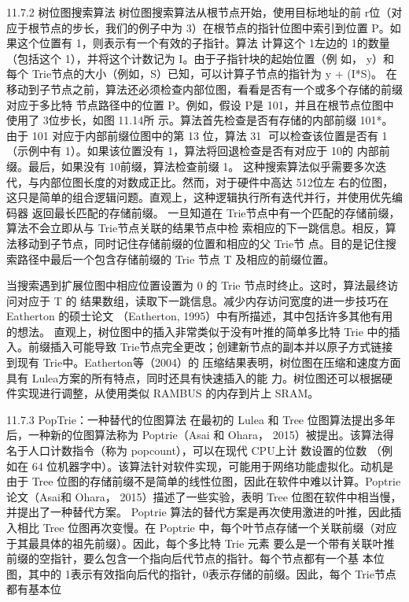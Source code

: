 11.7.2 树位图搜索算法
树位图搜索算法从根节点开始，使用目标地址的前 r位（对应于根节点的步长，我们的例子中为
3）在根节点的指针位图中索引到位置 P。如果这个位置有 1，则表示有一个有效的子指针。算法
计算这个 1左边的 1的数量（包括这个 1），并将这个计数记为 I。由于子指针块的起始位置（例
如， y）和每个 Trie节点的大小（例如，S）已知，可以计算子节点的指针为 y + (I*S)。
在移动到子节点之前，算法还必须检查内部位图，看看是否有一个或多个存储的前缀对应于多比特
节点路径中的位置 P。例如，假设 P是 101，并且在根节点位图中使用了 3位步长，如图 11.14所
示。算法首先检查是否有存储的内部前缀 101*。由于 101 对应于内部前缀位图中的第 13 位，算法
                                                      31
可以检查该位置是否有 1（示例中有 1）。如果该位置没有 1，算法将回退检查是否有对应于 10的
内部前缀。最后，如果没有 10前缀，算法检查前缀 1。
这种搜索算法似乎需要多次迭代，与内部位图长度的对数成正比。然而，对于硬件中高达 512位左
右的位图，这只是简单的组合逻辑问题。直观上，这种逻辑执行所有迭代并行，并使用优先编码器
返回最长匹配的存储前缀。
一旦知道在 Trie节点中有一个匹配的存储前缀，算法不会立即从与 Trie节点关联的结果节点中检
索相应的下一跳信息。相反，算法移动到子节点，同时记住存储前缀的位置和相应的父 Trie节
点。目的是记住搜索路径中最后一个包含存储前缀的 Trie 节点 T 及相应的前缀位置。



当搜索遇到扩展位图中相应位置设置为 0 的 Trie 节点时终止。这时，算法最终访问对应于 T 的
结果数组，读取下一跳信息。减少内存访问宽度的进一步技巧在 Eatherton 的硕士论文
（Eatherton, 1995）中有所描述，其中包括许多其他有用的想法。
直观上，树位图中的插入非常类似于没有叶推的简单多比特 Trie 中的插入。前缀插入可能导致
Trie节点完全更改；创建新节点的副本并以原子方式链接到现有 Trie中。Eatherton等（2004）的
压缩结果表明，树位图在压缩和速度方面具有 Lulea方案的所有特点，同时还具有快速插入的能
力。树位图还可以根据硬件实现进行调整，从使用类似 RAMBUS 的内存到片上 SRAM。

11.7.3 PopTrie：一种替代的位图算法
在最初的 Lulea 和 Tree 位图算法提出多年后，一种新的位图算法称为 Poptrie（Asai 和
Ohara， 2015）被提出。该算法得名于人口计数指令（称为 popcount），可以在现代 CPU上计
数设置的位数
（例如在 64 位机器字中）。该算法针对软件实现，可能用于网络功能虚拟化。动机是由于 Tree
位图的存储前缀不是简单的线性位图，因此在软件中难以计算。Poptrie论文（Asai和 Ohara，
2015）描述了一些实验，表明 Tree 位图在软件中相当慢，并提出了一种替代方案。
Poptrie 算法的替代方案是再次使用激进的叶推，因此插入相比 Tree 位图再次变慢。在 Poptrie
中，每个叶节点存储一个关联前缀（对应于其最具体的祖先前缀）。因此，每个多比特 Trie 元素
要么是一个带有关联叶推前缀的空指针，要么包含一个指向后代节点的指针。每个节点都有一个基
本位图，其中的 1表示有效指向后代的指针，0表示存储的前缀。因此，每个 Trie节点都有基本位

